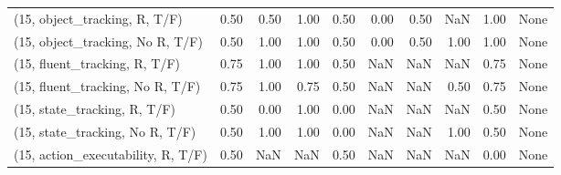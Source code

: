\begin{table*}[h!]
\begin{adjustbox}{width=2\columnwidth,center}
\begin{tabular}{lrrr|rrr|rrr}
\midrule
(15, object\_tracking, R, T/F)         &                      0.50 &                  0.50 &                      1.00 &                          0.50 &                      0.00 &                          0.50 &                                    NaN &                               1.00 &                                  None \\
(15, object\_tracking, No R, T/F)      &                      0.50 &                  1.00 &                      1.00 &                          0.50 &                      0.00 &                          0.50 &                                   1.00 &                               1.00 &                                  None \\
(15, fluent\_tracking, R, T/F)         &                      0.75 &                  1.00 &                      1.00 &                          0.50 &                       NaN &                           NaN &                                    NaN &                               0.75 &                                  None \\
(15, fluent\_tracking, No R, T/F)      &                      0.75 &                  1.00 &                      0.75 &                          0.50 &                       NaN &                           NaN &                                   0.50 &                               0.75 &                                  None \\
(15, state\_tracking, R, T/F)          &                      0.50 &                  0.00 &                      1.00 &                          0.00 &                       NaN &                           NaN &                                    NaN &                               0.50 &                                  None \\
(15, state\_tracking, No R, T/F)       &                      0.50 &                  1.00 &                      1.00 &                          0.00 &                       NaN &                           NaN &                                   1.00 &                               0.50 &                                  None \\
(15, action\_executability, R, T/F)    &                      0.50 &                   NaN &                       NaN &                          0.50 &                       NaN &                           NaN &                                    NaN &                               0.00 &                                  None \\

\end{tabular}
\end{adjustbox}
\end{table*}
